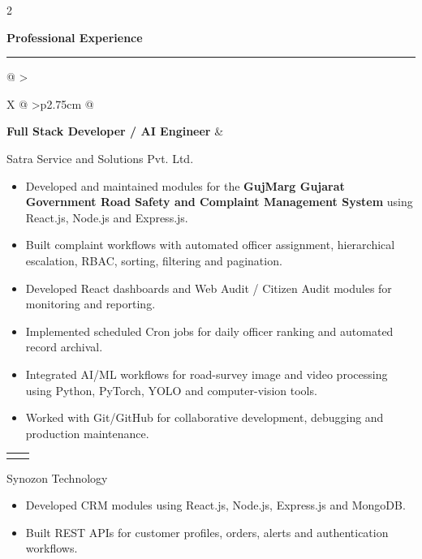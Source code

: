 ﻿\documentclass[10pt,a4paper]{article}
\makeatletter
\newcommand{\cvsection}[1]{%
    \vspace{3pt}
    {\large\bfseries\textcolor{darkcol}{#1}}
    \par
    \vspace{2pt}
    {\color{accentcol}\rule{\linewidth}{1.1pt}}
    \vspace{3pt}
}
\newcommand{\datebox}[1]{%
    \colorbox{accentcol}{%
        \makebox[2.75cm][c]{%
            \textcolor{white}{\scriptsize\bfseries #1}
        }%
    }%
}
\newcommand{\event}[4]{%

    \vspace{1pt}

    \noindent
    \begin{tabularx}{\linewidth}{
        @{}
        >{\raggedright\arraybackslash}X
        @{\hspace{5pt}}
        >{\raggedleft\arraybackslash}p{2.75cm}
        @{}
    }
        {\small\bfseries\textcolor{darkcol}{#2}}
        &
        \datebox{#1}
    \end{tabularx}

    \vspace{1pt}

    {\small\textcolor{lightcol}{#3}}

    \vspace{1pt}

    #4

    \vspace{2pt}
}
\makeatother
\begin{document}
\begin{paracol}{2}

\cvsection{Professional Experience}


\event
{Dec 2024 -- Present}
{Full Stack Developer / AI Engineer}
{Satra Service and Solutions Pvt. Ltd.}
{
\begin{itemize}

\item {\small
Developed and maintained modules for the
\textbf{GujMarg Gujarat Government Road Safety and Complaint
Management System} using React.js, Node.js and Express.js.
}

\item {\small
Built complaint workflows with automated officer assignment,
hierarchical escalation, RBAC, sorting, filtering and pagination.
}

\item {\small
Developed React dashboards and Web Audit / Citizen Audit modules
for monitoring and reporting.
}

\item {\small
Implemented scheduled Cron jobs for daily officer ranking
and automated record archival.
}

\item {\small
Integrated AI/ML workflows for road-survey image and video
processing using Python, PyTorch, YOLO and computer-vision tools.
}

\item {\small
Worked with Git/GitHub for collaborative development,
debugging and production maintenance.
}

\end{itemize}
}


\event
{Aug 2023 -- Oct 2024}
{Backend Developer Intern}
{Synozon Technology}
{
\begin{itemize}

\item {\small
Developed CRM modules using React.js, Node.js, Express.js
and MongoDB.
}

\item {\small
Built REST APIs for customer profiles, orders, alerts
and authentication workflows.
}


\end{itemize}}
\end{paracol}
\end{document}
